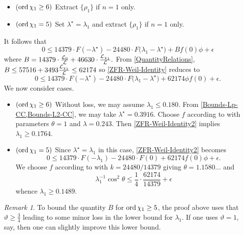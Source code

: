 \documentclass[12pt,psamsfonts]{amsart}
\DeclareRobustCommand{\SkipTocEntry}[5]{}
\theoremstyle{definition}
\theoremstyle{remark}
\newtheorem*{rem*}{Remark}
\numberwithin{equation}{section}
\begin{document}
\begin{itemize}
	\item  ($\mathrm{ord}\, \chi_1 \geq 6)$ Extract $\{\rho_1\}$ if $n=1$ only. 
	\item $(\mathrm{ord}\, \chi_1 = 5)$ Set $\lambda^{\star} = \lambda_1$ and extract $\{\rho_1\}$ if $n=1$ only. 
\end{itemize}
It follows that
\begin{equation} 
0 \leq 14379 \cdot F(-\lambda^{\star})  - 24480 \cdot F\big( \lambda_1 - \lambda^{\star} \big) + B f(0) \phi + \epsilon
\label{ZFR-Weil-Identity}
\end{equation}
where $B = 14379 \cdot \tfrac{\mathcal{L}_0}{\mathcal{L}} + 46630 \cdot \tfrac{\mathcal{L}_{\chi_1}}{\mathcal{L}}.$ From \cref{QuantityRelations}, $B \leq 57516 + 3493 \tfrac{\mathcal{L}_{\chi_1}}{\mathcal{L}} \leq 62174$ so \eqref{ZFR-Weil-Identity} reduces to
\begin{equation} 
0 \leq 14379 \cdot F(-\lambda^{\star})  - 24480 \cdot F\big( \lambda_1 - \lambda^{\star} \big) + 62174 \phi f(0) + \epsilon.
\label{ZFR-Weil-Identity2}
\end{equation}
We now consider cases. 
\begin{itemize}
	\item $(\mathrm{ord}\, \chi_1 \geq 6)$ Without loss, we may assume $\lambda_1 \leq 0.180$. From \cref{Bounds-Lp-CC,Bounds-L2-CC}, we may take $\lambda^{\star} = 0.3916$. Choose $f$ according to \cite[Lemma 7.1]{HBLinnik} with parameters $\theta = 1$ and $\lambda = 0.243$. Then \eqref{ZFR-Weil-Identity2} implies $\lambda_1 \geq 0.1764$. 

	\item $(\mathrm{ord}\, \chi_1 = 5)$ Since $\lambda^{\star} = \lambda_1$ in this case, \eqref{ZFR-Weil-Identity2} becomes
	\[
	0 \leq 14379 \cdot F(-\lambda_1)  - 24480 \cdot F(0)+ 62174 f(0) \phi + \epsilon.
	\]
	We choose $f$ according to \cite[Lemma 7.5]{HBLinnik} with $k = 24480/14379$ giving $\theta = 1.1580...$ and
	\[
	\lambda_1^{-1} \cos^2 \theta \leq \frac{1}{4} \cdot \frac{62174}{14379} + \epsilon
	\]
	whence $\lambda_1 \geq 0.1489$. 
\end{itemize}

\begin{rem*} To bound the quantity $B$ for $\mathrm{ord}\, \chi_1 \geq 5$, the proof above uses that $\vartheta \geq \tfrac{3}{4}$ leading to some minor loss in the lower bound for $\lambda_1$. If one uses $\vartheta = 1$, say, then one can slightly improve this lower bound. 
\end{rem*}

\noindent
{}
\end{document}
